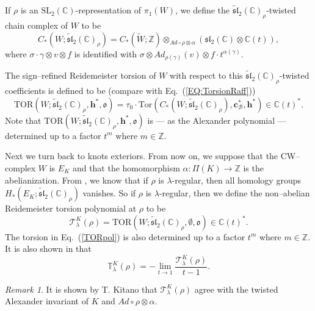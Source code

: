 \documentclass[a4paper]{amsart}
\theoremstyle{plain}
\theoremstyle{definition}
\theoremstyle{remark}
\newtheorem{remark}{Remark}%
\newcommand{\Z}{{\mathbb Z}}
\newcommand{\C}{{\mathbb C}}
\newcommand{\CC}{{\mathbb C}}
\newcommand{\SL}{{\mathrm{SL}_2(\C)}}
\newcommand{\T}{\mathcal{T}}
\newcommand{\sll}{\mathfrak{sl}_2(\CC)}
\newcommand{\tsll}{\widetilde{\mathfrak{sl}}_2(\CC)}
\begin{document}
If $\rho$ is an $\SL$-representation of $\pi_1(W)$, we define the $\tsll_\rho$-twisted chain complex of $W$ to be
\[
    C_*(W;\tsll_\rho) = C_*(\widetilde W;\Z) 
                           \otimes_{Ad \circ \rho \otimes \alpha} 
                           \left(\sll \otimes \C(t)\right),
\]
where $\sigma \cdot \gamma \otimes v \otimes f$ is identified with 
$\sigma \otimes Ad_{\rho(\gamma)}(v) \otimes f \cdot t^{\alpha(\gamma)}$.

The sign--refined Reidemeister torsion of $W$ with respect to this $\tsll_\rho$-twisted {coefficients} is defined to be (compare with Eq.~(\ref{EQ:TorsionRaff}))
\[
\mathrm{TOR}(W;\tsll_\rho, \mathbf{h}^*, \mathfrak{o})
=
\tau_0 \cdot \mathrm{Tor}(C_*(W;\tsll_\rho), \mathbf{c}^*_{\mathcal{B}}, \mathbf{h}^*) \in \C(t)^{*}.
\]
Note that
$\mathrm{TOR}(W;\tsll_\rho, \mathbf{h}^*, \mathfrak{o})$ is --- as the Alexander polynomial --- determined up to 
a factor $t^m$ where $m \in \Z$.


Next we turn back to knots exteriors. From now on, we suppose that the CW--complex $W$ is $E_K$ and that the homomorphism $\alpha : \Pi(K) \to \Z$ is the abelianization. 
From \cite[Proposition 3.1.1]{YY1}, we know that if $\rho$ is $\lambda$-regular, then all homology groups $H_*(E_K;\tsll_\rho)$ vanishes.
So if $\rho$ is $\lambda$-regular, then we define the non--abelian Reidemeister torsion polynomial at $\rho$ to be
\begin{equation}\label{TORpol}
\T^{K}_{\lambda}(\rho)
=
\mathrm{TOR}(W;\tsll_\rho, \emptyset, \mathfrak{o}) \in \C(t)^*.  
\end{equation}
The torsion in Eq.~(\ref{TORpol}) is also determined up to a factor $t^m$ where $m \in \Z$.
It is also shown in \cite[Theorem 3.1.2]{YY1} that 
\[
\mathbb{T}^K_{\lambda}(\rho) = - \lim_{t \to 1}
\frac{\T^K_{\lambda}(\rho)}{t-1}.
\]

\begin{remark}
It is shown by T. Kitano \cite[Theorem A]{Kitano} that $\T^{K}_{\lambda}(\rho)$ agree with the twisted Alexander invariant 
of $K$ and {$Ad \circ \rho \otimes \alpha$}. 
\end{remark}
\end{document}
